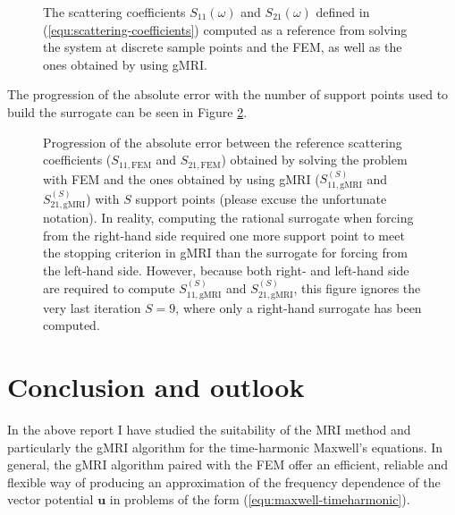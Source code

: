 \documentclass[11pt, a4paper]{article}
\begin{document}
\begin{figure}[ht]
    \centering
    
    \caption{The scattering coefficients $S_{11}(\omega)$ and $S_{21}(\omega)$
    defined in (\ref{equ:scattering-coefficients}) computed as a reference
    from solving the system at discrete sample points and the
    \acrshort{FEM}, as well as the ones obtained by using \acrshort{gMRI}.}
    \label{fig:circular-waveguide-scattering}
\end{figure}

The progression of the
absolute error with the number of support points used to build the surrogate
can be seen in Figure \ref{fig:circular-waveguide-error}.

\begin{figure}[ht]
    \centering
    
    \caption{Progression of the absolute error between the reference scattering
    coefficients ($S_{11, \textrm{FEM}}$ and $S_{21, \textrm{FEM}}$) obtained by solving the problem with \acrshort{FEM} and the 
    ones obtained by using \acrshort{gMRI} ($S_{11, \textrm{gMRI}}^{(S)}$ and $S_{21, \textrm{gMRI}}^{(S)}$)
    with $S$ support points (please excuse the unfortunate notation). 
    In reality, computing the rational surrogate when forcing from the right-hand
    side required one more support point to meet the stopping criterion in \acrshort{gMRI}
    than the surrogate for forcing from the left-hand side. However, because both
    right- and left-hand side are required to compute $S_{11, \textrm{gMRI}}^{(S)}$
    and $S_{21, \textrm{gMRI}}^{(S)}$, this figure ignores the very last iteration
    $S=9$, where only a right-hand surrogate has been computed.}
    \label{fig:circular-waveguide-error}
\end{figure}

\clearpage
\newpage
\section{Conclusion and outlook}
\label{sec:conclusion}

In the above report I have studied the suitability of the \acrfull{MRI} method and
particularly the \acrfull{gMRI} algorithm for the time-harmonic Maxwell's equations.
In general, the \acrshort{gMRI} algorithm paired with the \acrfull{FEM} 
offer an efficient, reliable and flexible way of producing an approximation 
of the frequency dependence of the vector potential $\mathbf{u}$ in problems
of the form (\ref{equ:maxwell-timeharmonic}).
\end{document}
